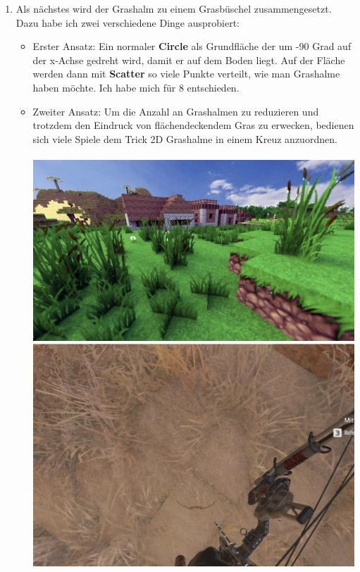 \documentclass[paper=a4,fontsize=12pt,ngerman]{scrartcl}
\begin{document}
\begin{enumerate}
		\item Als nächstes wird der Grashalm zu einem Grasbüschel zusammengesetzt. Dazu habe ich zwei verschiedene Dinge ausprobiert:
		\begin{itemize}
			\item Erster Ansatz: Ein normaler \textbf{Circle} als Grundfläche der um -90 Grad auf der x-Achse gedreht wird, damit er auf dem Boden liegt. Auf der Fläche werden dann mit \textbf{Scatter} so viele Punkte verteilt, wie man Grashalme haben möchte. Ich habe mich für 8 entschieden. 
			\item Zweiter Ansatz: Um die Anzahl an Grashalmen zu reduzieren und trotzdem den Eindruck von flächendeckendem Gras zu erwecken, bedienen sich viele Spiele dem Trick 2D Grashalme in einem Kreuz anzuordnen.\\ \\
			\includegraphics*[scale=0.23]{graphics/grass_cross_1.jpg}
			\includegraphics*[scale=0.19]{graphics/grass_cross_2.jpg}\\

\end{itemize}
\end{enumerate}
\end{document}
